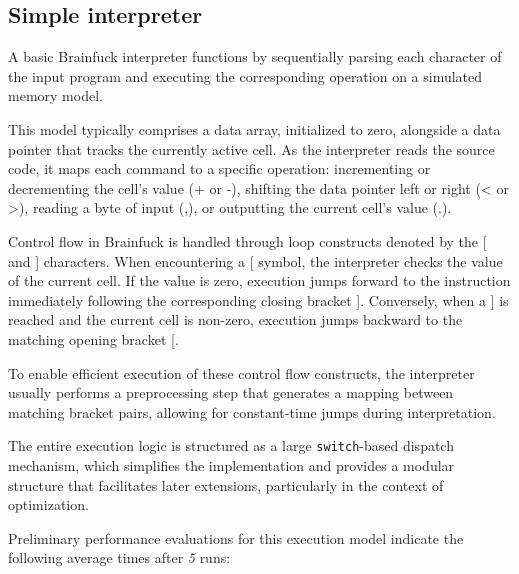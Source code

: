 \subsection{Simple interpreter}
\label{sec:ch2sec2sub1}

\par A basic Brainfuck interpreter functions by sequentially parsing each character of the input program and executing the corresponding operation on a simulated memory model.

\par This model typically comprises a data array, initialized to zero, alongside a data pointer that tracks the currently active cell. As the interpreter reads the source code, it maps each command to a specific operation: incrementing or decrementing the cell's value (+ or -), shifting the data pointer left or right (< or >), reading a byte of input (,), or outputting the current cell's value (.).

\par Control flow in Brainfuck is handled through loop constructs denoted by the [ and ] characters. When encountering a [ symbol, the interpreter checks the value of the current cell. If the value is zero, execution jumps forward to the instruction immediately following the corresponding closing bracket ]. Conversely, when a ] is reached and the current cell is non-zero, execution jumps backward to the matching opening bracket [.

\par To enable efficient execution of these control flow constructs, the interpreter usually performs a preprocessing step that generates a mapping between matching bracket pairs, allowing for constant-time jumps during interpretation.

\par The entire execution logic is structured as a large \texttt{switch}-based dispatch mechanism, which simplifies the implementation and provides a modular structure that facilitates later extensions, particularly in the context of optimization.

\par Preliminary performance evaluations for this execution model indicate the following average times after \textit{5} runs:

